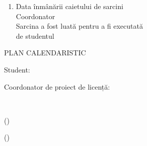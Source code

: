 \begin{titlepage}
\begin{titlepagefont}
\begin{enumerate}[label=\arabic*.]
            
            \item Data înmânării caietului de sarcini \emph{\taskdate} \\
            Coordonator \emph{\teachername} \dotfill \\
            Sarcina a fost luată pentru a fi executată \\
            de studentul \emph{\studentname} \dotfill\ \emph{\taskdate}
        
        \end{enumerate}
        
        {PLAN CALENDARISTIC \par}
        
        \vfill
        
        \begin{minipage}{0.35\textwidth}
            \raggedleft
            {Student: \par}
            \bigskip
            {Coordonator de proiect de licență: \par}
        \end{minipage}
        ~
        \begin{minipage}{0.35\textwidth}
            \raggedright
            {\emph{\studentname} (\dotfill) \par}
            \bigskip
            {\emph{\teachername} (\dotfill) \par}
        \end{minipage}
	
	\end{titlepagefont}
\end{titlepage}
